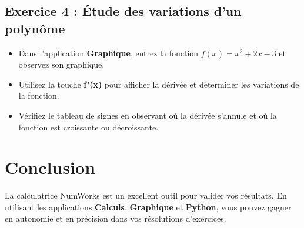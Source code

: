 \documentclass{article}
\begin{document}
\subsection{Exercice 4 : Étude des variations d'un polynôme}
\begin{itemize}
\item Dans l'application \textbf{Graphique}, entrez la fonction $f(x) = x^2 + 2x - 3$ et observez son graphique.
\item Utilisez la touche \textbf{f'(x)} pour afficher la dérivée et déterminer les variations de la fonction.
\item Vérifiez le tableau de signes en observant où la dérivée s'annule et où la fonction est croissante ou décroissante.
\end{itemize}

\section{Conclusion}
La calculatrice NumWorks est un excellent outil pour valider vos résultats. En utilisant les applications \textbf{Calculs}, \textbf{Graphique} et \textbf{Python}, vous pouvez gagner en autonomie et en précision dans vos résolutions d'exercices.
\end{document}
